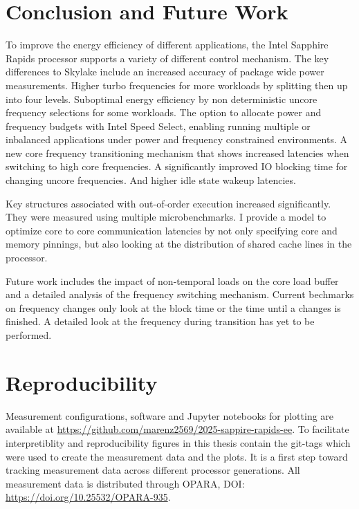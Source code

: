 \chapter{Conclusion and Future Work}
\label{sec:summary}

To improve the energy efficiency of different applications, the Intel Sapphire Rapids processor supports a variety of different control mechanism.
The key differences to Skylake include an increased accuracy of package wide power measurements.
Higher turbo frequencies for more workloads by splitting then up into four levels.
Suboptimal energy efficiency by non deterministic uncore frequency selections for some workloads.
The option to allocate power and frequency budgets with Intel Speed Select, enabling running multiple or inbalanced applications under power and frequency constrained environments.
A new core frequency transitioning mechanism that shows increased latencies when switching to high core frequencies.
A significantly improved IO blocking time for changing uncore frequencies.
And higher idle state wakeup latencies.

Key structures associated with out-of-order execution increased significantly.
They were measured using multiple microbenchmarks.
I provide a model to optimize core to core communication latencies by not only specifying core and memory pinnings, but also looking at the distribution of shared cache lines in the processor.

Future work includes the impact of non-temporal loads on the core load buffer and a detailed analysis of the frequency switching mechanism.
Current bechmarks on frequency changes only look at the block time or the time until a changes is finished.
A detailed look at the frequency during transition has yet to be performed.

\chapter*{Reproducibility}
Measurement configurations, software and Jupyter notebooks for plotting are available at \url{https://github.com/marenz2569/2025-sappire-rapids-ee}.
To facilitate interpretiblity and reproducibility figures in this thesis contain the git-tags which were used to create the measurement data and the plots.
It is a first step toward tracking measurement data across different processor generations.
All measurement data is distributed through OPARA, DOI: \url{https://doi.org/10.25532/OPARA-935}.
